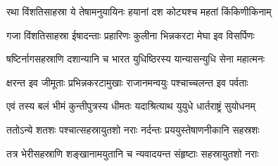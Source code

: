 \twolineshloka
{रथा विंशतिसाहस्रा ये तेषामनुयायिनः}
{हयानां दश कोट्यश्च महतां किंकिणीकिनाम्}


\twolineshloka
{गजा विंशतिसाहस्रा ईषादन्ताः प्रहारिणः}
{कुलीना भिन्नकरटा मेघा इव विसर्पिणः}


\twolineshloka
{षष्टिर्नागसहस्राणि दशान्यानि च भारत}
{युधिष्ठिरस्य यान्यासन्युधि सेना महात्मनः}


\twolineshloka
{क्षरन्त इव जीमूताः प्रभिन्नकरटामुखाः}
{राजानमन्वयुः पश्चाच्चलन्त इव पर्वताः}


\twolineshloka
{एवं तस्य बलं भीमं कुन्तीपुत्रस्य धीमतः}
{यदाश्रित्याथ युयुधे धार्तराष्ट्रं सुयोधनम्}


\twolineshloka
{ततोऽन्ये शतशः पश्चात्सहस्रायुतशो नराः}
{नर्दन्तः प्रययुस्तेषाणनीकानि सहस्रशः}


\twolineshloka
{तत्र भेरीसहस्राणि शङ्खानामयुतानि च}
{न्यवादयन्त संहृष्टाः सहस्रायुतशो नराः}


